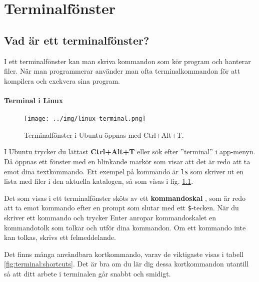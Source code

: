 
\chapter{Terminalfönster}\label{appendix:terminal}

\section{Vad är ett terminalfönster?}

I ett terminalfönster kan man skriva kommandon som kör program och hanterar filer. När man programmerar använder man ofta terminalkommandon för att kompilera och exekvera sina program.  
 
\subsubsection{Terminal i Linux}

    \begin{figure}[!b]
    \centering
    \texttt{[image: ../img/linux-terminal.png]}
    \caption{Terminalfönster i Ubuntu öppnas med Ctrl+Alt+T.}
    \label{fig:terminal:linux}
    \end{figure}

I Ubuntu trycker du lättast \textbf{Ctrl+Alt+T} eller sök efter ''terminal'' i app-menyn.  Då öppnas ett fönster med en blinkande markör som visar att det är redo att ta emot dina textkommando. Ett exempel på kommando är \texttt{ls} som skriver ut en lista med filer i den aktuella katalogen, så som visas i fig. \ref{fig:terminal:linux}.

Det som visas i ett terminalfönster sköts av ett \textbf{kommandoskal} , som är redo att ta emot kommando efter en prompt som slutar med ett \texttt{\$}-tecken. När du skriver ett kommando och trycker Enter anropar kommandoskalet en kommandotolk som tolkar och utför dina kommandon. Om ett kommando inte kan tolkas, skrivs ett felmeddelande. 

Det finns många användbara kortkommando, varav de viktigaste visas i tabell \ref{fig:terminal:shortcuts}. Det är bra om du lär dig dessa kortkommandon utantill så att ditt arbete i terminalen går snabbt och smidigt.

